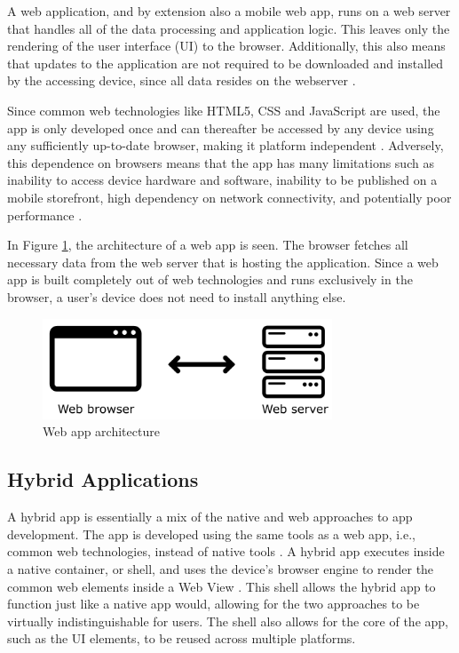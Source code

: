 \documentclass[a4paper,12pt]{article}
\begin{document}
A web application, and by extension also a mobile web app, runs on a web server that handles all of the data processing and application logic. This leaves only the rendering of the user interface (UI) to the browser. Additionally, this also means that updates to the application are not required to be downloaded and installed by the accessing device, since all data resides on the webserver \cite{crossplatform_taxonomy, crossplatform_2012}.

Since common web technologies like HTML5, CSS and JavaScript are used, the app is only developed once and can thereafter be accessed by any device using any sufficiently up-to-date browser, making it platform independent \cite{crossplatform_taxonomy}. Adversely, this dependence on browsers means that the app has many limitations such as  inability to access device hardware and software, inability to be published on a mobile storefront, high dependency on network connectivity, and potentially poor performance \cite{crossplatform_taxonomy, crossplatform_2012}.

In Figure \ref{fig:webapp}, the architecture of a web app is seen. The browser fetches all necessary data from the web server that is hosting the application. Since a web app is built completely out of web technologies and runs exclusively in the browser, a user’s device does not need to install anything else.

\begin{figure}[h]%
	\centering
	\includegraphics[height=3cm]{img/Other/struct_webapp.png}
	\caption{Web app architecture}%
	\label{fig:webapp}%
\end{figure}

\vspace{-4px}
\subsection{Hybrid Applications}
\label{Theory_hybridApps}
A hybrid app is essentially a mix of the native and web approaches to app development. The app is developed using the same tools as a web app, i.e., common web technologies, instead of native tools \cite{mobile_web_apps_2013}. A hybrid app executes inside a native container, or shell, and uses the device’s browser engine to render the common web elements inside a Web View \cite{crossplatform_2012}. This shell allows the hybrid app to function just like a native app would, allowing for the two approaches to be virtually indistinguishable for users. The shell also allows for the core of the app, such as the UI elements, to be reused across multiple platforms.
\end{document}
